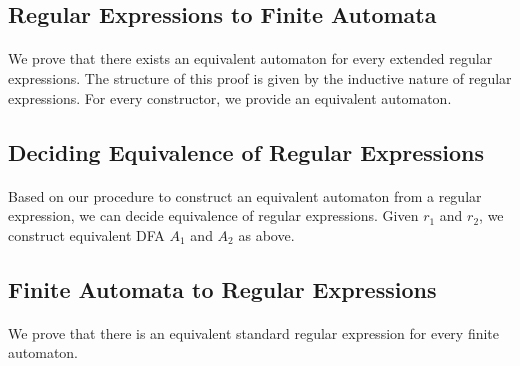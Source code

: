 \documentclass[11pt,a4paper,oneside]{book}
\begin{document}
            \subsection{Regular Expressions to Finite Automata}

                \paragraph{} 
                    We prove that there exists an equivalent automaton for every extended regular expressions.
                    The structure of this proof is given by the inductive nature of regular expressions.
                    For every constructor, we provide an equivalent automaton.


            \subsection{Deciding Equivalence of Regular Expressions}

                \paragraph{} 
                    Based on our procedure to construct an equivalent automaton from a regular expression, we can decide equivalence of regular expressions. Given $r_1$ and $r_2$, we construct equivalent DFA $A_1$ and $A_2$ as above.
                    

            \subsection{Finite Automata to Regular Expressions}
                \paragraph{}
                    We prove that there is an equivalent standard regular expression for every finite automaton.

                
\end{document}

